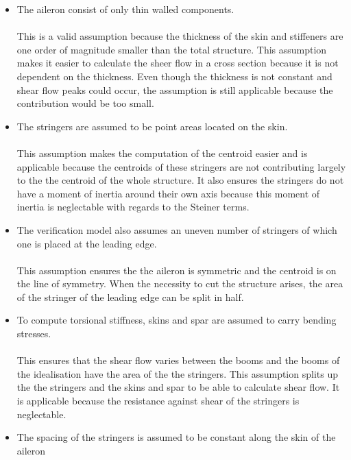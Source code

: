 \begin{itemize}
    \item The aileron consist of only thin walled components.\\\\
    This is a valid assumption because the thickness of the skin and stiffeners are one order of magnitude smaller than the total structure. This assumption makes it easier to calculate the sheer flow in a cross section because it is not dependent on the thickness. Even though the thickness is not constant and shear flow peaks could occur, the assumption is still applicable because the contribution would be too small.\\
    \item The stringers are assumed to be point areas located on the skin.\\ \\
    This assumption makes the computation of the centroid easier and is applicable because the centroids of these stringers are not contributing largely to the the centroid of the whole structure. It also ensures the stringers do not have a moment of inertia around their own axis because this moment of inertia is neglectable with regards to the Steiner terms.\\
    \item The verification model also assumes an uneven number of stringers of which one is placed at the leading edge.\\\\
    This assumption ensures the the aileron is symmetric and the centroid is on the line of symmetry. When the necessity to cut the structure arises, the area of the stringer of the leading edge can be split in half.\\
    \item To compute torsional stiffness, skins and spar are assumed to carry bending stresses.\\ \\ This ensures that the shear flow varies between the booms and the booms of the idealisation have the area of the the stringers. This assumption splits up the the stringers and the skins and spar to be able to calculate shear flow. It is applicable because the resistance against shear of the stringers is neglectable. \\
    \item The spacing of the stringers is assumed to be constant along the skin of the aileron
    
\end{itemize}

